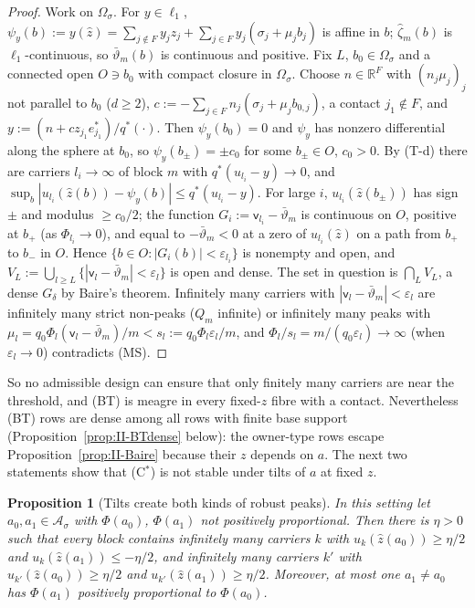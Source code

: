 \documentclass[10pt]{amsart}
\newtheorem{proposition}[theorem]{Proposition}
\theoremstyle{definition}
\theoremstyle{remark}
\newcommand{\R}{\mathbb R}
\newcommand{\zh}{\hat z}
\begin{document}
\begin{proof}
Work on $\Omega_\sigma$.  For $y\in\ell_1$, $\psi_y(b):=y(\zh)=\sum_{j\notin F}y_jz_j+
\sum_{j\in F}y_j(\sigma_j+\mu_jb_j)$ is affine in $b$; $\hat\zeta_m(b)$ is
$\ell_1$-continuous, so $\bar\vartheta_m(b)$ is continuous and positive.  Fix $L$,
$b_0\in\Omega_\sigma$ and a connected open $O\ni b_0$ with compact closure in
$\Omega_\sigma$.  Choose $n\in\R^F$ with $(n_j\mu_j)_j$ not parallel to $b_0$
($d\ge2$), $c:=-\sum_{j\in F}n_j(\sigma_j+\mu_jb_{0,j})$, a contact $j_1\notin F$,
and $y:=(n+cz_{j_1}e^*_{j_1})/q^*(\cdot)$.  Then $\psi_y(b_0)=0$ and $\psi_y$ has
nonzero differential along the sphere at $b_0$, so $\psi_y(b_\pm)=\pm c_0$ for
some $b_\pm\in O$, $c_0>0$.  By (T-d) there are carriers $l_i\to\infty$ of block
$m$ with $q^*(u_{l_i}-y)\to0$, and $\sup_b|u_{l_i}(\zh(b))-\psi_y(b)|\le q^*(u_{l_i}-
y)$.  For large $i$, $u_{l_i}(\zh(b_\pm))$ has sign $\pm$ and modulus $\ge c_0/2$;
the function $G_i:=\mathsf v_{l_i}-\bar\vartheta_m$ is continuous on $O$, positive at
$b_+$ (as $\Phi_{l_i}\to0$), and equal to $-\bar\vartheta_m<0$ at a zero of
$u_{l_i}(\zh)$ on a path from $b_+$ to $b_-$ in $O$.  Hence $\{b\in O:|G_i(b)|<
\varepsilon_{l_i}\}$ is nonempty and open, and $V_L:=\bigcup_{l\ge L}\{|\mathsf v_l-
\bar\vartheta_m|<\varepsilon_l\}$ is open and dense.  The set in question is
$\bigcap_LV_L$, a dense $G_\delta$ by Baire's theorem.  Infinitely many
carriers with $|\mathsf v_l-\bar\vartheta_m|<\varepsilon_l$ are infinitely many strict
non-peaks ($Q_m$ infinite) or infinitely many peaks with $\mu_l=q_0\Phi_l(\mathsf
v_l-\bar\vartheta_m)/m<s_l:=q_0\Phi_l\varepsilon_l/m$, and $\Phi_l/s_l=m/(q_0
\varepsilon_l)\to\infty$ (when $\varepsilon_l\to0$) contradicts (MS).
\end{proof}

So no admissible design can ensure that only finitely many carriers are
near the threshold, and (BT) is meagre in every fixed-$z$ fibre with a
contact.  Nevertheless (BT) rows are dense among all rows with finite base
support (Proposition~\ref{prop:II-BTdense} below): the owner-type rows
escape Proposition~\ref{prop:II-Baire} because their $z$ depends on $a$.
The next two statements show that (C$^*$) is not stable under tilts of $a$
at fixed $z$.

\begin{proposition}[Tilts create both kinds of robust peaks]\label{prop:II-FZ}
In this setting let $a_0,a_1\in\mathcal A_\sigma$ with $\Phi(a_0)$, $\Phi(a_1)$ not
positively proportional.  Then there is $\eta>0$ such that every block
contains infinitely many carriers $k$ with $u_k(\zh(a_0))\ge\eta/2$ and
$u_k(\zh(a_1))\le-\eta/2$, and infinitely many carriers $k'$ with
$u_{k'}(\zh(a_0))\ge\eta/2$ and $u_{k'}(\zh(a_1))\ge\eta/2$.  Moreover, at most
one $a_1\ne a_0$ has $\Phi(a_1)$ positively proportional to $\Phi(a_0)$.
\end{proposition}
\end{document}
